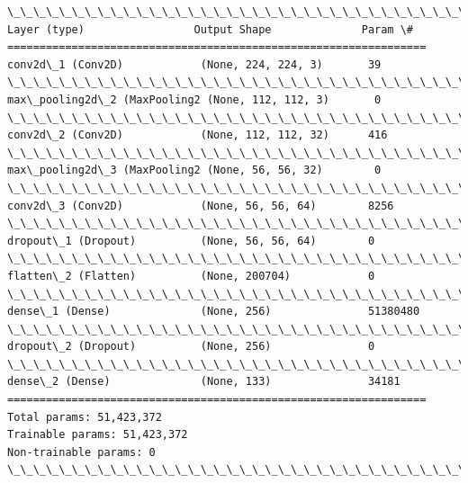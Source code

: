 \documentclass[11pt]{article}
\begin{document}
    \begin{Verbatim}[commandchars=\\\{\}]
\_\_\_\_\_\_\_\_\_\_\_\_\_\_\_\_\_\_\_\_\_\_\_\_\_\_\_\_\_\_\_\_\_\_\_\_\_\_\_\_\_\_\_\_\_\_\_\_\_\_\_\_\_\_\_\_\_\_\_\_\_\_\_\_\_
Layer (type)                 Output Shape              Param \#   
=================================================================
conv2d\_1 (Conv2D)            (None, 224, 224, 3)       39        
\_\_\_\_\_\_\_\_\_\_\_\_\_\_\_\_\_\_\_\_\_\_\_\_\_\_\_\_\_\_\_\_\_\_\_\_\_\_\_\_\_\_\_\_\_\_\_\_\_\_\_\_\_\_\_\_\_\_\_\_\_\_\_\_\_
max\_pooling2d\_2 (MaxPooling2 (None, 112, 112, 3)       0         
\_\_\_\_\_\_\_\_\_\_\_\_\_\_\_\_\_\_\_\_\_\_\_\_\_\_\_\_\_\_\_\_\_\_\_\_\_\_\_\_\_\_\_\_\_\_\_\_\_\_\_\_\_\_\_\_\_\_\_\_\_\_\_\_\_
conv2d\_2 (Conv2D)            (None, 112, 112, 32)      416       
\_\_\_\_\_\_\_\_\_\_\_\_\_\_\_\_\_\_\_\_\_\_\_\_\_\_\_\_\_\_\_\_\_\_\_\_\_\_\_\_\_\_\_\_\_\_\_\_\_\_\_\_\_\_\_\_\_\_\_\_\_\_\_\_\_
max\_pooling2d\_3 (MaxPooling2 (None, 56, 56, 32)        0         
\_\_\_\_\_\_\_\_\_\_\_\_\_\_\_\_\_\_\_\_\_\_\_\_\_\_\_\_\_\_\_\_\_\_\_\_\_\_\_\_\_\_\_\_\_\_\_\_\_\_\_\_\_\_\_\_\_\_\_\_\_\_\_\_\_
conv2d\_3 (Conv2D)            (None, 56, 56, 64)        8256      
\_\_\_\_\_\_\_\_\_\_\_\_\_\_\_\_\_\_\_\_\_\_\_\_\_\_\_\_\_\_\_\_\_\_\_\_\_\_\_\_\_\_\_\_\_\_\_\_\_\_\_\_\_\_\_\_\_\_\_\_\_\_\_\_\_
dropout\_1 (Dropout)          (None, 56, 56, 64)        0         
\_\_\_\_\_\_\_\_\_\_\_\_\_\_\_\_\_\_\_\_\_\_\_\_\_\_\_\_\_\_\_\_\_\_\_\_\_\_\_\_\_\_\_\_\_\_\_\_\_\_\_\_\_\_\_\_\_\_\_\_\_\_\_\_\_
flatten\_2 (Flatten)          (None, 200704)            0         
\_\_\_\_\_\_\_\_\_\_\_\_\_\_\_\_\_\_\_\_\_\_\_\_\_\_\_\_\_\_\_\_\_\_\_\_\_\_\_\_\_\_\_\_\_\_\_\_\_\_\_\_\_\_\_\_\_\_\_\_\_\_\_\_\_
dense\_1 (Dense)              (None, 256)               51380480  
\_\_\_\_\_\_\_\_\_\_\_\_\_\_\_\_\_\_\_\_\_\_\_\_\_\_\_\_\_\_\_\_\_\_\_\_\_\_\_\_\_\_\_\_\_\_\_\_\_\_\_\_\_\_\_\_\_\_\_\_\_\_\_\_\_
dropout\_2 (Dropout)          (None, 256)               0         
\_\_\_\_\_\_\_\_\_\_\_\_\_\_\_\_\_\_\_\_\_\_\_\_\_\_\_\_\_\_\_\_\_\_\_\_\_\_\_\_\_\_\_\_\_\_\_\_\_\_\_\_\_\_\_\_\_\_\_\_\_\_\_\_\_
dense\_2 (Dense)              (None, 133)               34181     
=================================================================
Total params: 51,423,372
Trainable params: 51,423,372
Non-trainable params: 0
\_\_\_\_\_\_\_\_\_\_\_\_\_\_\_\_\_\_\_\_\_\_\_\_\_\_\_\_\_\_\_\_\_\_\_\_\_\_\_\_\_\_\_\_\_\_\_\_\_\_\_\_\_\_\_\_\_\_\_\_\_\_\_\_\_

    \end{Verbatim}
\end{document}
